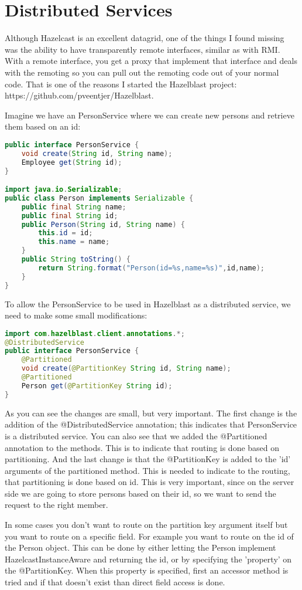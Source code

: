\chapter{Distributed Services}
Although Hazelcast is an excellent datagrid, one of the things I found missing was the ability to have transparently remote interfaces, similar as with RMI. With a remote interface, you get a proxy that implement that interface and deals with the remoting so you can pull out the remoting code out of your normal code. That is one of the reasons I started the Hazelblast project: https://github.com/pveentjer/Hazelblast.

Imagine we have an PersonService where we can create new persons and retrieve them based on an id:
\begin{lstlisting}[language=java]
public interface PersonService {
    void create(String id, String name);
    Employee get(String id);
}

import java.io.Serializable;
public class Person implements Serializable {
    public final String name;
    public final String id;
    public Person(String id, String name) {
        this.id = id;
        this.name = name;
    }
    public String toString() {
        return String.format("Person(id=%s,name=%s)",id,name);
    }
}
\end{lstlisting}

To allow the PersonService to be used in Hazelblast as a distributed service, we need to make some small modifications:
\begin{lstlisting}[language=java]
import com.hazelblast.client.annotations.*;
@DistributedService
public interface PersonService {
    @Partitioned
    void create(@PartitionKey String id, String name);
    @Partitioned
    Person get(@PartitionKey String id);
}
\end{lstlisting}
As you can see the changes are small, but very important. The first change is the addition of the @DistributedService annotation; this indicates that PersonService is a distributed service. You can also see that we added the @Partitioned annotation to the methods. This is to indicate that routing is done based on partitioning. And the last change is that the @PartitionKey is added to the 'id' arguments of the partitioned method. This is needed to indicate to the routing, that partitioning is done based on id. This is very important, since on the server side we are going to store persons based on their id, so we want to send the request to the right member. 

In some cases you don't want to route on the partition key argument itself but you want to route on a specific field. For example you want to route on the id of the Person object. This can be done by either letting the Person implement HazelcastInstanceAware and returning the id, or by specifying the 'property' on the @PartitionKey. When this property is specified, first an accessor method is tried and if that doesn't exist than direct field access is done.


